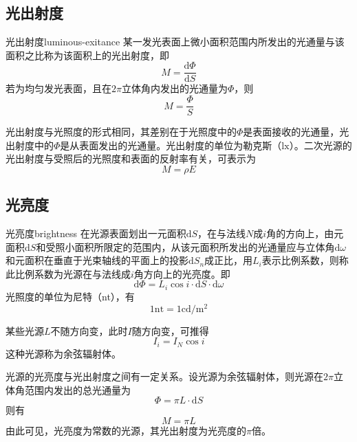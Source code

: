 \documentclass[cn,10pt,chinesefont=founder,math=mtpro2,cite=super,toc=onecol,twoside,openany]{elegantbook}
\begin{document}
\subsection{光出射度}
\begin{definition}{光出射度}{luminous-exitance}
某一发光表面上微小面积范围内所发出的光通量与该面积之比称为该面积上的光出射度，即
\begin{equation}
M=\frac{\mathrm{d}\varPhi}{\mathrm{d}S}
\end{equation}
若为均匀发光表面，且在$2\pi$立体角内发出的光通量为$\varPhi$，则
\begin{equation}
M=\frac{\varPhi}{S}
\end{equation}
\end{definition}
光出射度与光照度的形式相同，其差别在于光照度中的$\varPhi$是表面接收的光通量，光出射度中的$\varPhi$是从表面发出的光通量。光出射度的单位为勒克斯（$\mathrm{lx}$）。二次光源的光出射度与受照后的光照度和表面的反射率有关，可表示为
\begin{equation}
M=\rho E
\label{eq:luminous-exitance}
\end{equation}

\subsection{光亮度}
\begin{definition}{光亮度}{brightness}
	在光源表面划出一元面积$\mathrm{d}S$，在与法线$N$成$i$角的方向上，由元面积$\mathrm{d}S$和受照小面积所限定的范围内，从该元面积所发出的光通量应与立体角$\mathrm{d}\omega$和元面积在垂直于光束轴线的平面上的投影$\mathrm{d}S_n$成正比，用$L_i$表示比例系数，则称此比例系数为光源在与法线成$i$角方向上的光亮度。即
	\begin{equation}
	\mathrm{d}\varPhi=L_i\cos i\cdot\mathrm{d}S\cdot\mathrm{d}\omega
	\end{equation}
	光照度的单位为尼特（nt），有
	\begin{equation}
	1\mathrm{nt}=1\mathrm{cd/m^2}
	\end{equation}
\end{definition}
某些光源$L$不随方向变，此时$I$随方向变，可推得
\begin{equation}
I_i=I_N\cos i
\end{equation}
这种光源称为余弦辐射体。

光源的光亮度与光出射度之间有一定关系。设光源为余弦辐射体，则光源在$2\pi$立体角范围内发出的总光通量为
\begin{equation}
\varPhi=\pi L\cdot\mathrm{d}S
\end{equation}
则有
\begin{equation}
M=\pi L
\end{equation}
由此可见，光亮度为常数的光源，其光出射度为光亮度的$\pi$倍。
\end{document}
